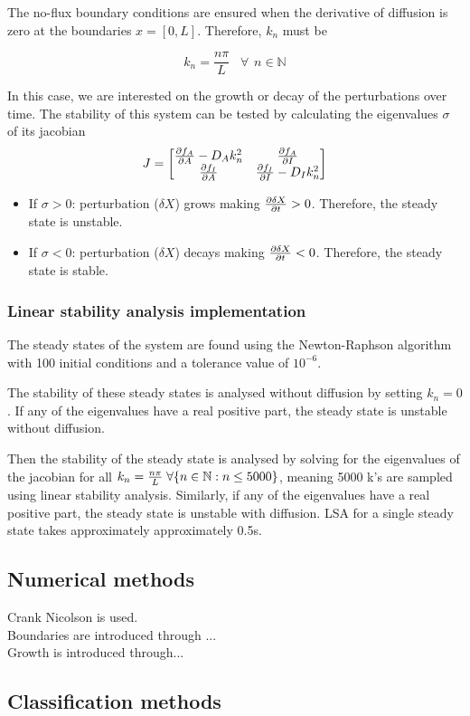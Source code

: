 The no-flux boundary conditions are ensured when the derivative of diffusion is zero at the boundaries $x=[0,L]$. Therefore, $k_{n}$ must be
\newcommand{\nat}{\numberset{N}}
\newcommand{\numberset}[1]{\mathbb{#1}}

\begin{equation}
    k_{n}=\frac{n \pi}{L} \hspace{10pt} \forall \hspace{5pt} {n \in \nat }
    \label{kn}
\end{equation}

In this case, we are interested on the growth or decay of the perturbations over time. The stability of this system can be tested by calculating the eigenvalues $\sigma$ of its jacobian
\begin{equation}
    J = \begin{bmatrix}
            \pdv{f_{A}}{A} - D_{A}k_{n}^2 &
            \pdv{f_{A}}{I}  \\
            \pdv{f_{I}}{A} &
            \pdv{f_{I}}{I} - D_{I}k_{n}^2
    \end{bmatrix}
    \label{jacobian_diffusion}
\end{equation}


\begin{itemize}
    \item If $\sigma > 0$: perturbation ($\delta X$) grows making $\pdv{\delta X}{t} > 0$.
    Therefore, the steady state is unstable.
    \item If $\sigma < 0$: perturbation ($\delta X$) decays making $\pdv{\delta X}{t} < 0$.
    Therefore, the steady state is stable.
\end{itemize}
\subsubsection{Linear stability analysis implementation}
The steady states of the system are found using the Newton-Raphson algorithm with 100 initial conditions and a tolerance value of $10^{-6}$.

The stability of these steady states is analysed without diffusion by setting $k_{n}=0$.
If any of the eigenvalues have a real positive part, the steady state is unstable without diffusion.

Then the stability of the steady state is analysed by solving for the eigenvalues of the jacobian for all $k_{n}=\frac{n\pi}{L} \hspace{0.1cm}\forall \{n \in \mathbb{N} : n \leq 5000\} $, meaning 5000 k's are sampled using linear stability analysis. Similarly, if any of the eigenvalues have a real positive part, the steady state is unstable with diffusion. LSA for a single steady state takes approximately approximately 0.5s.

\subsection*{Numerical methods}
Crank Nicolson is used.\\
Boundaries are introduced through ...\\
Growth is introduced through...\\



\subsection*{Classification methods}



